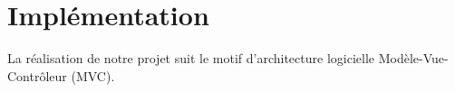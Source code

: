 \section{Implémentation}
\label{sec:implementation}

La réalisation de notre projet suit le motif d'architecture logicielle Modèle-Vue-Contrôleur (MVC).


